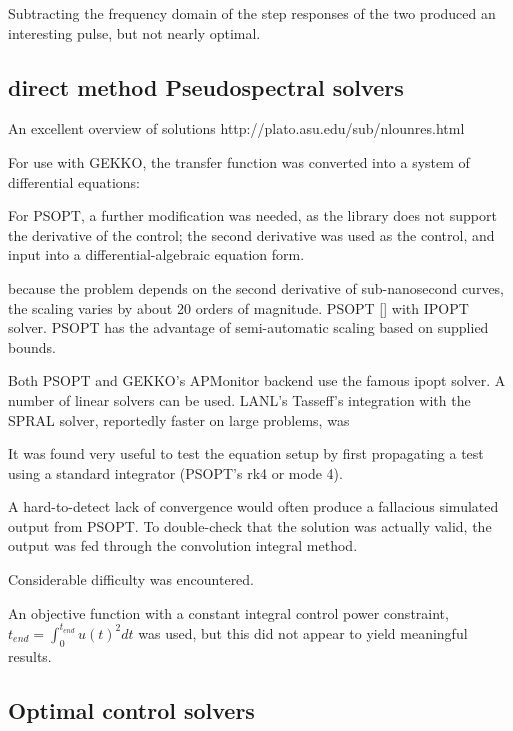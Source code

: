 \documentclass[fleqn,10pt]{paper}
\begin{document}
Subtracting the frequency domain of the step responses of the two produced an interesting pulse, but not nearly optimal.


\subsection*{direct method Pseudospectral solvers}

An excellent overview of solutions http://plato.asu.edu/sub/nlounres.html

For use with GEKKO, the transfer function was converted into a system of differential equations:

For PSOPT, a further modification was needed, as the library does not support the derivative of the control; the second derivative was used as the control, and input into a differential-algebraic equation form.



because the problem depends on the second derivative of sub-nanosecond curves, the scaling varies by about 20 orders of magnitude.
PSOPT [] with IPOPT\cite{implementation2006} solver. PSOPT has the advantage of semi-automatic scaling based on supplied bounds. 

Both PSOPT and GEKKO's APMonitor backend use the famous ipopt solver. A number of linear solvers can be used. LANL's Tasseff's integration with the SPRAL solver, reportedly faster on large problems, was 

It was found very useful to test the equation setup by first propagating a test using a standard integrator (PSOPT's rk4 or mode 4).

A hard-to-detect lack of convergence would often produce a fallacious simulated output from PSOPT. To double-check that the solution was actually valid, the output was fed through the convolution integral method.

Considerable difficulty was encountered. 

An objective function with a constant integral control power constraint, $t_{end} = \int_0^{t_{end}} u(t)^2 dt$ was used, but this did not appear to yield meaningful results.

\subsection*{Optimal control solvers}
\end{document}
